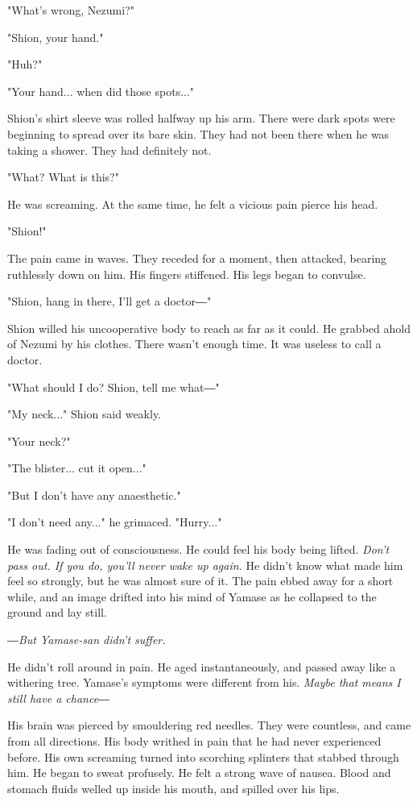 "What's wrong, Nezumi?"

"Shion, your hand."

"Huh?"

"Your hand... when did those spots..."

Shion's shirt sleeve was rolled halfway up his arm. There were dark
spots were beginning to spread over its bare skin. They had not been
there when he was taking a shower. They had definitely not.

"What? What is this?"

He was screaming. At the same time, he felt a vicious pain pierce his
head.

"Shion!"

The pain came in waves. They receded for a moment, then attacked,
bearing ruthlessly down on him. His fingers stiffened. His legs began to
convulse.

"Shion, hang in there, I'll get a doctor―"

Shion willed his uncooperative body to reach as far as it could. He
grabbed ahold of Nezumi by his clothes. There wasn't enough time. It was
useless to call a doctor.

"What should I do? Shion, tell me what―"

"My neck..." Shion said weakly.

"Your neck?"

"The blister... cut it open..."

"But I don't have any anaesthetic."

"I don't need any..." he grimaced. "Hurry..."

He was fading out of consciousness. He could feel his body being lifted.
\emph{Don't pass out. If you do, you'll never wake up again.} He didn't know
what made him feel so strongly, but he was almost sure of it. The pain
ebbed away for a short while, and an image drifted into his mind of
Yamase as he collapsed to the ground and lay still.

\emph{―But Yamase-san didn't suffer.}

He didn't roll around in pain. He aged instantaneously, and passed away
like a withering tree. Yamase's symptoms were different from his. \emph{Maybe
	that means I still have a chance―}

His brain was pierced by smouldering red needles. They were countless,
and came from all directions. His body writhed in pain that he had never
experienced before. His own screaming turned into scorching splinters
that stabbed through him. He began to sweat profusely. He felt a strong
wave of nausea. Blood and stomach fluids welled up inside his mouth, and
spilled over his lips.

